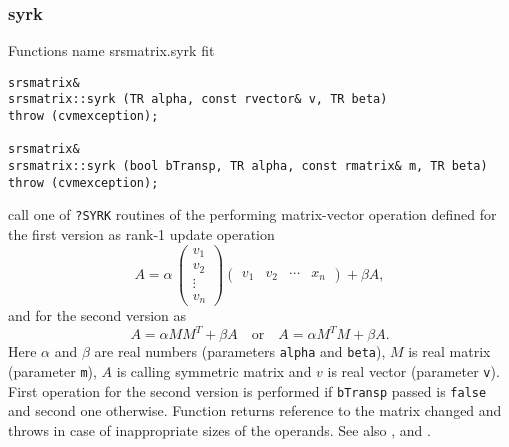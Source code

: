 \subsubsection{syrk}
Functions%
\pdfdest name {srsmatrix.syrk} fit
\begin{verbatim}
srsmatrix& 
srsmatrix::syrk (TR alpha, const rvector& v, TR beta) 
throw (cvmexception);

srsmatrix& 
srsmatrix::syrk (bool bTransp, TR alpha, const rmatrix& m, TR beta)
throw (cvmexception);
\end{verbatim}
call one of \verb"?SYRK" routines of the
performing  matrix-vector operation defined for the first version as
rank-1 update operation
\begin{equation*}
A=\alpha\,\begin{pmatrix}
v_1 \\
v_2 \\
\vdots \\
v_n
\end{pmatrix}
\begin{pmatrix}
v_1 & v_2 & \cdots & x_n
\end{pmatrix} + \beta A,
\end{equation*}
and for the second version as
\begin{equation*}
A=\alpha MM^T + \beta A\quad\text{or}\quad A=\alpha M^TM + \beta A.
\end{equation*}
Here $\alpha$ and $\beta$ are real numbers 
(parameters \verb"alpha" and \verb"beta"),
$M$ is real matrix (parameter \verb"m"),
$A$ is  calling symmetric matrix
and $v$ is real vector (parameter \verb"v").
First operation for the second version 
is performed if \verb"bTransp" passed
is \verb"false" and second one otherwise.
Function
returns  reference to the matrix changed and throws
in case of inappropriate sizes of the operands.
See also
,
 and .

